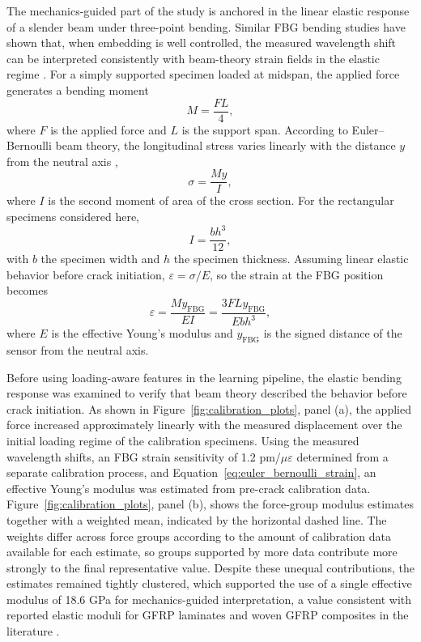 \documentclass[notspecified,article,submit,pdftex,moreauthors]{Definitions/mdpi}
\begin{document}
The mechanics-guided part of the study is anchored in the linear elastic response of a slender beam under three-point bending. Similar FBG bending studies have shown that, when embedding is well controlled, the measured wavelength shift can be interpreted consistently with beam-theory strain fields in the elastic regime \cite{gabardi2023}. For a simply supported specimen loaded at midspan, the applied force generates a bending moment
\begin{equation}
M = \frac{F L}{4},
\end{equation}
where $F$ is the applied force and $L$ is the support span. According to Euler--Bernoulli beam theory, the longitudinal stress varies linearly with the distance $y$ from the neutral axis \cite{ochsner2021},
\begin{equation}
\sigma = \frac{M y}{I},
\end{equation}
where $I$ is the second moment of area of the cross section. For the rectangular specimens considered here,
\begin{equation}
I = \frac{b h^3}{12},
\end{equation}
with $b$ the specimen width and $h$ the specimen thickness. Assuming linear elastic behavior before crack initiation, $\varepsilon = \sigma / E$, so the strain at the FBG position becomes
\begin{equation}
\varepsilon = \frac{M y_{\mathrm{FBG}}}{E I} = \frac{3 F L y_{\mathrm{FBG}}}{E b h^3},
\label{eq:euler_bernoulli_strain}
\end{equation}
where $E$ is the effective Young's modulus and $y_{\mathrm{FBG}}$ is the signed distance of the sensor from the neutral axis.

Before using loading-aware features in the learning pipeline, the elastic bending response was examined to verify that beam theory described the behavior before crack initiation. As shown in Figure~\ref{fig:calibration_plots}, panel (a), the applied force increased approximately linearly with the measured displacement over the initial loading regime of the calibration specimens. Using the measured wavelength shifts, an FBG strain sensitivity of 1.2 pm/$\mu\varepsilon$ determined from a separate calibration process, and Equation~\ref{eq:euler_bernoulli_strain}, an effective Young's modulus was estimated from pre-crack calibration data. Figure~\ref{fig:calibration_plots}, panel (b), shows the force-group modulus estimates together with a weighted mean, indicated by the horizontal dashed line. The weights differ across force groups according to the amount of calibration data available for each estimate, so groups supported by more data contribute more strongly to the final representative value. Despite these unequal contributions, the estimates remained tightly clustered, which supported the use of a single effective modulus of 18.6 GPa for mechanics-guided interpretation, a value consistent with reported elastic moduli for GFRP laminates and woven GFRP composites in the literature \cite{bazli2019,gao2016}.
\end{document}
